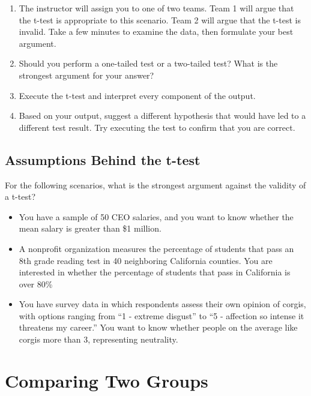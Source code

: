\documentclass[
]{book}
\theoremstyle{definition}
\theoremstyle{definition}
\theoremstyle{definition}
\theoremstyle{definition}
\theoremstyle{remark}
\begin{document}
\begin{enumerate}
\def\labelenumi{\arabic{enumi}.}
\item
  The instructor will assign you to one of two teams. Team 1 will argue that the t-test is appropriate to this scenario. Team 2 will argue that the t-test is invalid. Take a few minutes to examine the data, then formulate your best argument.
\item
  Should you perform a one-tailed test or a two-tailed test? What is the strongest argument for your answer?
\item
  Execute the t-test and interpret every component of the output.
\item
  Based on your output, suggest a different hypothesis that would have led to a different test result. Try executing the test to confirm that you are correct.
\end{enumerate}

\hypertarget{assumptions-behind-the-t-test}{%
\section{Assumptions Behind the t-test}\label{assumptions-behind-the-t-test}}

For the following scenarios, what is the strongest argument against the validity of a t-test?

\begin{itemize}
\item
  You have a sample of 50 CEO salaries, and you want to know whether the mean salary is greater than \$1 million.
\item
  A nonprofit organization measures the percentage of students that pass an 8th grade reading test in 40 neighboring California counties. You are interested in whether the percentage of students that pass in California is over 80\%
\item
  You have survey data in which respondents assess their own opinion of corgis, with options ranging from ``1 - extreme disgust'' to ``5 - affection so intense it threatens my career.'' You want to know whether people on the average like corgis more than 3, representing neutrality.
\end{itemize}

\hypertarget{comparing-two-groups}{%
\chapter{Comparing Two Groups}\label{comparing-two-groups}}
\end{document}
